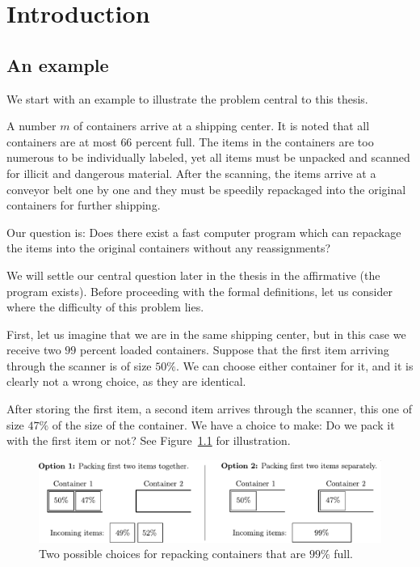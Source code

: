 \chapter{Introduction}\label{chap:intro}

\section{An example}\label{sec:example}

We start with an example to illustrate the problem central to this thesis.

A number $m$ of containers arrive at a shipping center. It is noted
that all containers are at most $66$ percent full. The items in the
containers are too numerous to be individually labeled, yet all items
must be unpacked and scanned for illicit and dangerous material. After
the scanning, the items arrive at a conveyor belt one by one and they must
be speedily repackaged into the original containers for further shipping.

Our question is: Does there exist a fast computer program which can
repackage the items into the original containers without any
reassignments?

We will settle our central question later in the thesis in the
affirmative (the program exists). Before proceeding with the formal
definitions, let us consider where the difficulty of this problem
lies.

First, let us imagine that we are in the same shipping center, but in
this case we receive two $99$ percent loaded containers. Suppose that
the first item arriving through the scanner is of size $50\%$. We can
choose either container for it, and it is clearly not a wrong choice,
as they are identical.

After storing the first item, a second item arrives through the
scanner, this one of size $47\%$ of the size of the container. We have
a choice to make: Do we pack it with the first item or not? See
Figure~\ref{fig:ninetynine} for illustration.

\begin{figure}[th]
\begin{center}
\includegraphics[width=\textwidth]{img/ninetynine.pdf}
\end{center}
\caption{Two possible choices for repacking containers that are $99\%$ full.}
\label{fig:ninetynine}
\end{figure}



